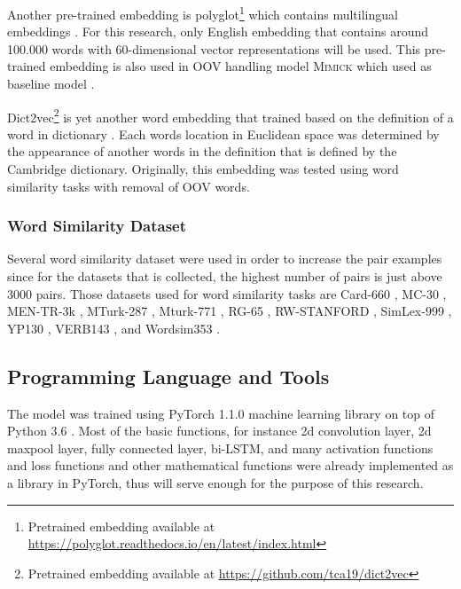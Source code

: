             Another pre-trained embedding is
            polyglot\footnote{Pretrained embedding available at
            \url{https://polyglot.readthedocs.io/en/latest/index.html}}
             which contains multilingual embeddings
            \citep{polyglot2013alrfou}. For this research, only
            English embedding that contains around 100.000 words with
            60-dimensional vector representations will be used. This
            pre-trained embedding is also used in OOV handling model
            \textsc{Mimick} which used as baseline model
            \citep{mimicking2017Pinter}.

            Dict2vec\footnote{Pretrained embedding available at
            \url{https://github.com/tca19/dict2vec}} is yet another word
            embedding that trained based on the definition of a word in
            dictionary \citep{dict2vect2017tissier}. Each words
            location in Euclidean space was determined by the
            appearance of another words in the definition that is
            defined by the Cambridge dictionary. Originally, this
            embedding was tested using word similarity tasks with
            removal of OOV words.

        \subsubsection{Word Similarity Dataset}
            Several word similarity dataset were used in order to
            increase the pair examples since for the datasets that is
            collected, the highest number of pairs is just above 3000
            pairs. Those datasets used for word similarity tasks are
            Card-660 \citep{card660:pilehvar-etal:2018}, MC-30
            \citep{mc30:strongContextualHypothesis}, MEN-TR-3k
            \citep{mentr3k:bruni-etal-2012-distributional}, MTurk-287
            \citep{mturk287:Radinsky:2011:WTC:1963405.1963455},
            Mturk-771
            \citep{mturk771:Halawi:2012:LLW:2339530.2339751}, RG-65
            \citep{rg65:Rubenstein:1965:CCS:365628.365657},
            RW-STANFORD \citep{rw:luong-etal-2013-better}, SimLex-999
            \citep{simlex999:hill2014}, YP130
            \citep{yp130:inproceedings}, VERB143
            \citep{vp143:baker-etal-2014-unsupervised}, and Wordsim353
            \citep{wordsim353:2002:PSC:503104.503110}.

    \subsection{Programming Language and Tools}
        The model was trained using PyTorch 1.1.0 machine learning
        library on top of Python 3.6 \citep{pytorch2017paszke}. Most
        of the basic functions, for instance 2d convolution layer, 2d
        maxpool layer, fully connected layer, bi-LSTM, and many
        activation functions and loss functions and other mathematical
        functions were already implemented as a library in PyTorch,
        thus will serve enough for the purpose of this research.
            

